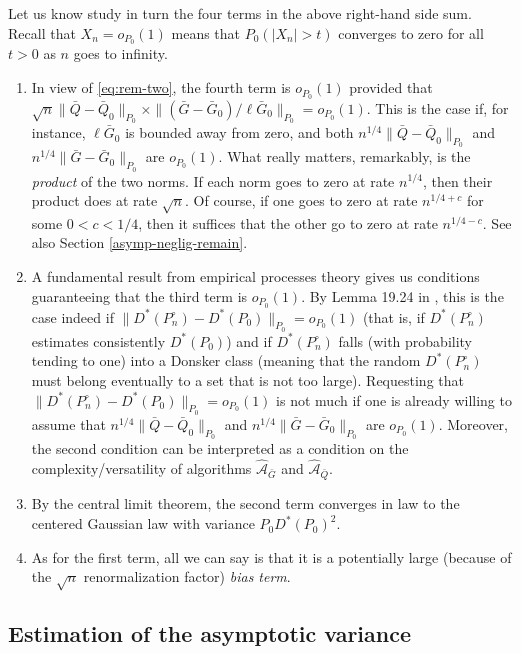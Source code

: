 \documentclass[11pt,openright,twoside]{book}
\newcommand{\Algo}{\widehat{\mathcal{A}}}
\newcommand{\Gbar}{\bar{G}}
\newcommand{\Phat}{P^{\circ}}
\newcommand{\Qbar}{\bar{Q}}
\theoremstyle{definition}
\theoremstyle{definition}
\theoremstyle{definition}
\theoremstyle{remark}
\begin{document}
Let us know study in turn the four terms in the above right-hand side
sum. Recall that \(X_n = o_{P_0}(1)\) means that \(P_0(|X_n| > t)\) converges to
zero for all \(t>0\) as \(n\) goes to infinity.

\begin{enumerate}
\def\labelenumi{\arabic{enumi}.}
\item
  In view of \eqref{eq:rem-two}, the fourth term is \(o_{P_0}(1)\) provided that
  \(\sqrt{n}\|\Qbar - \Qbar_{0}\|_{P_0} \times \|(\Gbar - \Gbar_{0})/\ell\Gbar_{0}\|_{P_0} = o_{P_0}(1)\). This is the case if, for
  instance, \(\ell\Gbar_{0}\) is bounded away from zero, and both
  \(n^{1/4}\|\Qbar - \Qbar_{0}\|_{P_0}\) and \(n^{1/4}\|\Gbar - \Gbar_{0}\|_{P_0}\) are \(o_{P_0}(1)\). What really matters, remarkably, is
  the \emph{product} of the two norms. If each norm goes to zero at rate
  \(n^{1/4}\), then their product does at rate \(\sqrt{n}\). Of course, if one
  goes to zero at rate \(n^{1/4 + c}\) for some \(0<c<1/4\), then it suffices
  that the other go to zero at rate \(n^{1/4 - c}\). See also Section
  \ref{asymp-neglig-remain}.
\item
  A fundamental result from empirical processes theory gives us conditions
  guaranteeing that the third term is \(o_{P_0}(1)\). By Lemma 19.24 in
  \citep{vdV98}, this is the case indeed if \(\|D^*(\Phat_n) - D^*(P_0)\|_{P_{0}} = o_{P_0} (1)\) (that is, if \(D^*(\Phat_n)\) estimates consistently \(D^*(P_0)\)) and if
  \(D^*(\Phat_n)\) falls (with probability tending to one) into a Donsker class
  (meaning that the random \(D^*(\Phat_n)\) must belong eventually to a set
  that is not too large). Requesting that \(\|D^*(\Phat_n) - D^*(P_0)\|_{P_{0}} = o_{P_0} (1)\) is not much if one is already willing to assume that
  \(n^{1/4}\|\Qbar - \Qbar_{0}\|_{P_0}\) and \(n^{1/4}\|\Gbar - \Gbar_{0}\|_{P_0}\) are \(o_{P_0}(1)\). Moreover, the second condition can be
  interpreted as a condition on the complexity/versatility of algorithms
  \(\Algo_{\Gbar}\) and \(\Algo_{\Qbar}\).
\item
  By the central limit theorem, the second term converges in law to the
  centered Gaussian law with variance \(P_0 D^*(P_0)^2\).
\item
  As for the first term, all we can say is that it is a potentially large
  (because of the \(\sqrt{n}\) renormalization factor) \emph{bias term}.
\end{enumerate}

\hypertarget{estimation-of-the-asymptotic-variance}{%
\subsection{Estimation of the asymptotic variance}\label{estimation-of-the-asymptotic-variance}}
\end{document}
